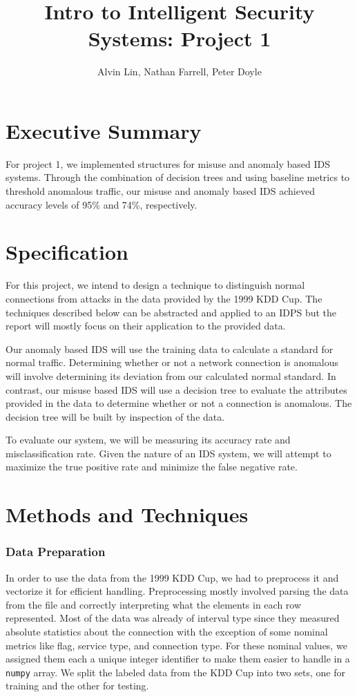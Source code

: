\documentclass[letterpaper,12pt]{article}
\title{Intro to Intelligent Security Systems: Project 1}
\author{Alvin Lin, Nathan Farrell, Peter Doyle}
\begin{document}
\maketitle

\section*{Executive Summary}
For project 1, we implemented structures for misuse and anomaly based IDS
systems. Through the combination of decision trees and using baseline metrics
to threshold anomalous traffic, our misuse and anomaly based IDS achieved
accuracy levels of 95\% and 74\%, respectively.

\section*{Specification}
For this project, we intend to design a technique to distinguish normal
connections from attacks in the data provided by the 1999 KDD Cup. The
techniques described below can be abstracted and applied to an IDPS but the
report will mostly focus on their application to the provided data. \par
Our anomaly based IDS will use the training data to calculate a standard for
normal traffic. Determining whether or not a network connection is anomalous
will involve determining its deviation from our calculated normal standard. In
contrast, our misuse based IDS will use a decision tree to evaluate the
attributes provided in the data to determine whether or not a connection is
anomalous. The decision tree will be built by inspection of the data. \par
To evaluate our system, we will be measuring its accuracy rate and
misclassification rate. Given the nature of an IDS system, we will attempt to
maximize the true positive rate and minimize the false negative rate.


\section*{Methods and Techniques}

\subsubsection*{Data Preparation}
In order to use the data from the 1999 KDD Cup, we had to preprocess it and
vectorize it for efficient handling. Preprocessing mostly involved parsing the
data from the file and correctly interpreting what the elements in each row
represented. Most of the data was already of interval type since they measured
absolute statistics about the connection with the exception of some nominal
metrics like flag, service type, and connection type. For these nominal values,
we assigned them each a unique integer identifier to make them easier to handle
in a \texttt{numpy} array. We split the labeled data from the KDD Cup into two
sets, one for training and the other for testing. \par
\end{document}
